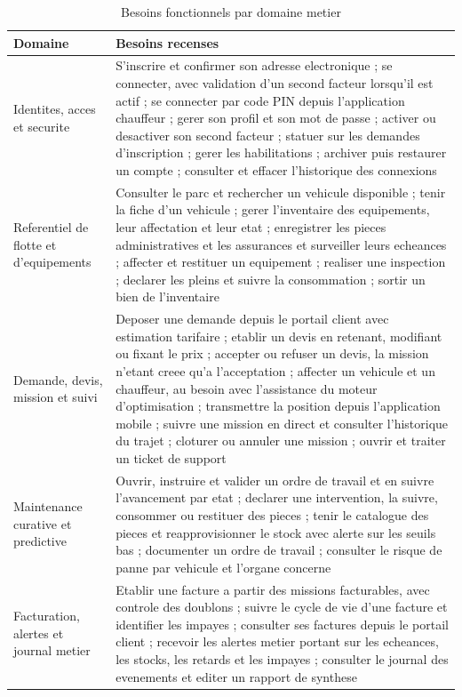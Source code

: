 \begin{table}[H]
\centering
\caption{Besoins fonctionnels par domaine metier}
\label{tab:besoins-fonctionnels}
\small
\begin{tabularx}{\textwidth}{@{}p{3.1cm}X@{}}
\toprule
\textbf{Domaine} & \textbf{Besoins recenses} \\ \midrule

Identites, acces et securite &
  S'inscrire et confirmer son adresse electronique ; se connecter, avec
  validation d'un second facteur lorsqu'il est actif ; se connecter par
  code PIN depuis l'application chauffeur ; gerer son profil et son mot
  de passe ; activer ou desactiver son second facteur ; statuer sur les
  demandes d'inscription ; gerer les habilitations ; archiver puis
  restaurer un compte ; consulter et effacer l'historique des
  connexions \\

Referentiel de flotte et d'equipements &
  Consulter le parc et rechercher un vehicule disponible ; tenir la fiche
  d'un vehicule ; gerer l'inventaire des equipements, leur affectation et
  leur etat ; enregistrer les pieces administratives et les assurances et
  surveiller leurs echeances ; affecter et restituer un equipement ;
  realiser une inspection ; declarer les pleins et suivre la
  consommation ; sortir un bien de l'inventaire \\

Demande, devis, mission et suivi &
  Deposer une demande depuis le portail client avec estimation
  tarifaire ; etablir un devis en retenant, modifiant ou fixant le prix ;
  accepter ou refuser un devis, la mission n'etant creee qu'a
  l'acceptation ; affecter un vehicule et un chauffeur, au besoin avec
  l'assistance du moteur d'optimisation ; transmettre la position depuis
  l'application mobile ; suivre une mission en direct et consulter
  l'historique du trajet ; cloturer ou annuler une mission ; ouvrir et
  traiter un ticket de support \\

Maintenance curative et predictive &
  Ouvrir, instruire et valider un ordre de travail et en suivre
  l'avancement par etat ; declarer une intervention, la suivre, consommer
  ou restituer des pieces ; tenir le catalogue des pieces et
  reapprovisionner le stock avec alerte sur les seuils bas ; documenter
  un ordre de travail ; consulter le risque de panne par vehicule et
  l'organe concerne \\

Facturation, alertes et journal metier &
  Etablir une facture a partir des missions facturables, avec controle
  des doublons ; suivre le cycle de vie d'une facture et identifier les
  impayes ; consulter ses factures depuis le portail client ; recevoir
  les alertes metier portant sur les echeances, les stocks, les retards
  et les impayes ; consulter le journal des evenements et editer un
  rapport de synthese \\


\end{tabularx}
\end{table}
